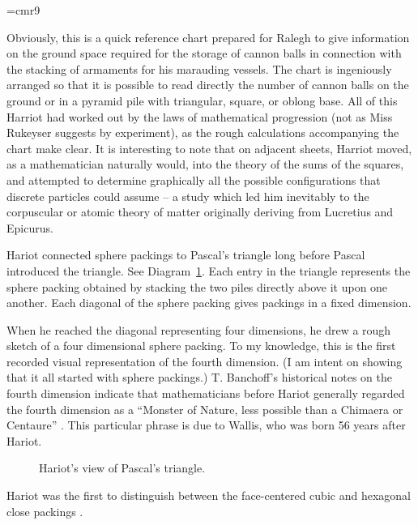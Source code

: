 {
\narrower
\font\ninerm=cmr9
\ninerm

    Obviously, this is a quick reference chart prepared for Ralegh to give information on the ground space required for the storage of cannon
    balls in connection with the stacking of armaments for his marauding vessels. The chart is ingeniously arranged so that it is possible to
    read directly the number of cannon balls on the ground or in a pyramid pile with triangular, square, or oblong base. All of this Harriot had
    worked out by the laws of mathematical progression (not as Miss Rukeyser suggests by experiment), as the rough calculations
    accompanying the chart make clear. It is interesting to note that on adjacent sheets, Harriot moved, as a mathematician naturally would,
    into the theory of the sums of the squares, and attempted to determine graphically all the possible configurations that discrete particles
    could assume -- a study which led him inevitably to the corpuscular or atomic theory of matter originally deriving from Lucretius and
    Epicurus. \cite[p.242]{Shi83}

}

\smallskip
Hariot connected sphere packings to Pascal's triangle long before
Pascal introduced the triangle. See Diagram~\ref{fig:pascal}.  Each entry in the triangle represents the sphere packing obtained
by stacking the two piles directly above it upon one another.  Each
diagonal of the sphere packing gives packings in a fixed dimension.

When he reached the diagonal representing four dimensions, he drew a
rough sketch of a four dimensional sphere packing.
To my knowledge,
this is the first recorded visual representation of the fourth dimension.
(I am intent on showing that 
it all started with sphere packings.)
T. Banchoff's historical notes on the fourth dimension
indicate that mathematicians before Hariot generally
regarded the fourth dimension
as a ``Monster of Nature, less possible than a Chimaera or Centaure''
\cite{Ban}.  This particular phrase is due to Wallis, who was born 
56 years after Hariot.

\begin{figure}[htb]
  \centering
  \caption{Hariot's view of Pascal's triangle.}
  \label{fig:pascal}
\end{figure}

Hariot was the first to distinguish between the face-centered
cubic and hexagonal close packings \cite[p.52]{Mas66}.

